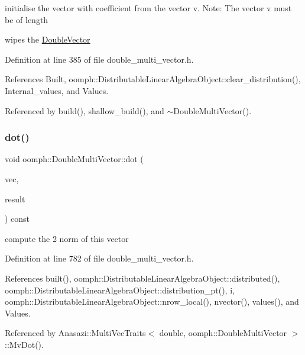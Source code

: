 initialise the vector with coefficient from the vector v. Note\+: The vector v must be of length 

wipes the \hyperlink{classoomph_1_1DoubleVector}{Double\+Vector} 

Definition at line 385 of file double\+\_\+multi\+\_\+vector.\+h.



References Built, oomph\+::\+Distributable\+Linear\+Algebra\+Object\+::clear\+\_\+distribution(), Internal\+\_\+values, and Values.



Referenced by build(), shallow\+\_\+build(), and $\sim$\+Double\+Multi\+Vector().

\mbox{\label{classoomph_1_1DoubleMultiVector_a873f053a08f9d52537c5cb6077bfef7d}} 
\subsubsection{\texorpdfstring{dot()}{dot()}}
{\footnotesize\ttfamily void oomph\+::\+Double\+Multi\+Vector\+::dot (\begin{DoxyParamCaption}\item[{const \hyperlink{classoomph_1_1DoubleMultiVector}{Double\+Multi\+Vector} \&}]{vec,  }\item[{std\+::vector$<$ double $>$ \&}]{result }\end{DoxyParamCaption}) const\hspace{0.3cm}{\ttfamily [inline]}}



compute the 2 norm of this vector 



Definition at line 782 of file double\+\_\+multi\+\_\+vector.\+h.



References built(), oomph\+::\+Distributable\+Linear\+Algebra\+Object\+::distributed(), oomph\+::\+Distributable\+Linear\+Algebra\+Object\+::distribution\+\_\+pt(), i, oomph\+::\+Distributable\+Linear\+Algebra\+Object\+::nrow\+\_\+local(), nvector(), values(), and Values.



Referenced by Anasazi\+::\+Multi\+Vec\+Traits$<$ double, oomph\+::\+Double\+Multi\+Vector $>$\+::\+Mv\+Dot().

